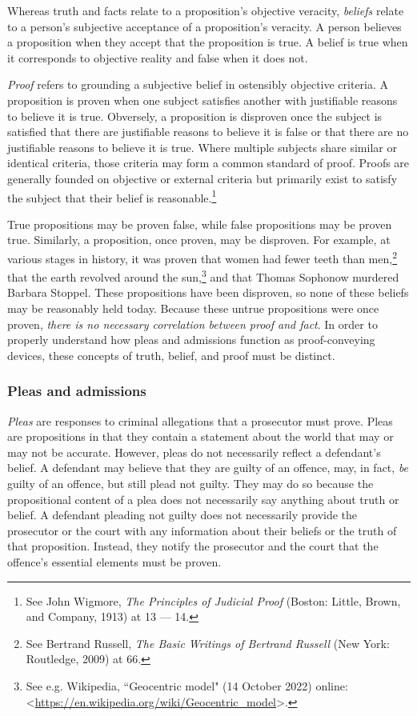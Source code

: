 Whereas truth and facts relate to a proposition's objective veracity, \textit{beliefs} relate to a person's subjective acceptance of a proposition's veracity. A person believes a proposition when they accept that the proposition is true. A belief is true when it corresponds to objective reality and false when it does not.  

\textit{Proof} refers to grounding a subjective belief in ostensibly objective criteria. A proposition is proven when one subject satisfies another with justifiable reasons to believe it is true. Obversely, a proposition is disproven once the subject is satisfied that there are justifiable reasons to believe it is false or that there are no justifiable reasons to believe it is true. Where multiple subjects share similar or identical criteria, those criteria may form a common standard of proof. Proofs are generally founded on objective or external criteria but primarily exist to satisfy the subject that their belief is reasonable.\footnote{See John Wigmore, \textit{The Principles of Judicial Proof} (Boston: Little, Brown, and Company, 1913) at 13 — 14.}

True propositions may be proven false, while false propositions may be proven true. Similarly, a proposition, once proven, may be disproven. For example, at various stages in history, it was proven that women had fewer teeth than men,\footnote{See Bertrand Russell, \textit{The Basic Writings of Bertrand Russell} (New York: Routledge, 2009) at 66.} that the earth revolved around the sun,\footnote{See e.g. Wikipedia, ``Geocentric model" (14 October 2022) online: \textless \url{https://en.wikipedia.org/wiki/Geocentric_model}\textgreater.} and that Thomas Sophonow murdered Barbara Stoppel. These propositions have been disproven, so none of these beliefs may be reasonably held today. Because these untrue propositions were once proven, \textit{there is no necessary correlation between proof and fact}. In order to properly understand how pleas and admissions function as proof-conveying devices, these concepts of truth, belief, and proof must be distinct.

\subsubsection{Pleas and admissions}

\textit{Pleas} are responses to criminal allegations that a prosecutor must prove. Pleas are propositions in that they contain a statement about the world that may or may not be accurate. However, pleas do not necessarily reflect a defendant's belief. A defendant may believe that they are guilty of an offence, may, in fact, \textit{be} guilty of an offence, but still plead not guilty. They may do so because the propositional content of a plea does not necessarily say anything about truth or belief. A defendant pleading not guilty does not necessarily provide the prosecutor or the court with any information about their beliefs or the truth of that proposition. Instead, they notify the prosecutor and the court that the offence's essential elements must be proven.

